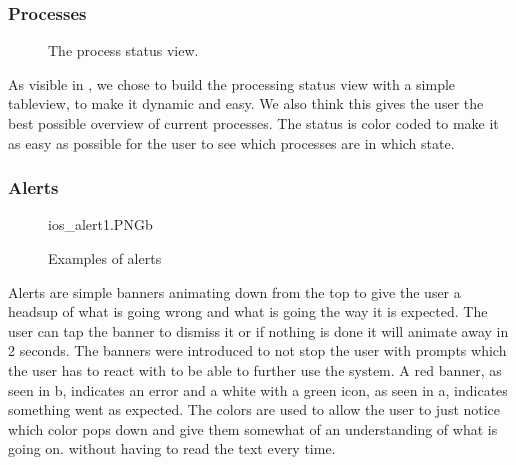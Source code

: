 \subsubsection{Processes}
\begin{figure}[ht]
\caption{The process status view.}
\label{fig:ios_processingStatus}
\end{figure}
\FloatBarrier

As visible in , we chose to build the processing status view with a simple tableview, to make it dynamic and easy. We also think this gives the user the best possible overview of current processes. The status is color coded to make it as easy as possible for the user to see which processes are in which state.

\subsubsection{Alerts}
\begin{figure}[ht]
		{ios_alert1.PNG}{b}
\caption{Examples of alerts}
\label{fig:ios_alerts}
\end{figure}
\FloatBarrier

Alerts are simple banners animating down from the top to give the user a headsup of what is going wrong and what is going the way it is expected. The user can tap the banner to dismiss it or if nothing is done it will animate away in 2 seconds. The banners were introduced to not stop the user with prompts which the user has to react with to be able to further use the system. A red banner, as seen in b, indicates an error and a white with a green icon, as seen in a, indicates something went as expected. The colors are used to allow the user to just notice which color pops down and give them somewhat of an understanding of what is going on. without having to read the text every time.
